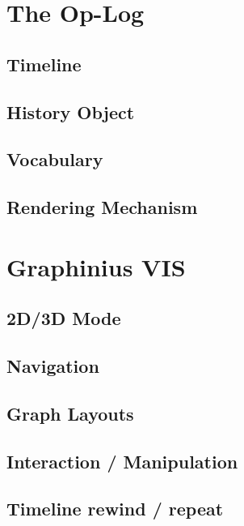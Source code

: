 \section{The Op-Log}
\label{sect:op_log}

	\subsection{Timeline}
	\label{ssect:timeline}
	
	\subsection{History Object}
	\label{ssect:history_object}

	\subsection{Vocabulary}
	\label{ssect:vocabulary}	

	\subsection{Rendering Mechanism}
	\label{ssect:rendering}


\section{Graphinius VIS}
\label{sect:graphinius_vis}

	\subsection{2D/3D Mode}
	\label{ssect:vis_2d3d}
	
	\subsection{Navigation}
	\label{ssect:vis_navigation}
	
	\subsection{Graph Layouts}
	\label{ssect:vis_layouts}	
	
	\subsection{Interaction / Manipulation}
	\label{ssect:vis_interact_manipulate}
	
	\subsection{Timeline rewind / repeat}
	\label{ssect:vis_timeline}
	
